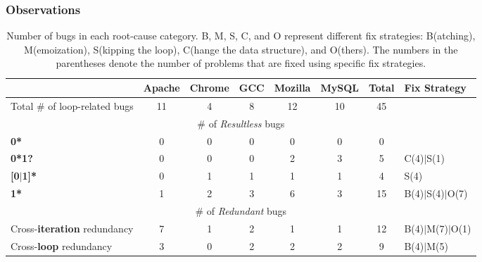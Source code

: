 \subsubsection{Observations}
\label{sec:study_ob}


\begin{table*}[tb!]
\small
\centering
{
\begin{tabular}{|lccccccl|}
\hline
&Apache&Chrome&GCC&Mozilla&MySQL&Total&Fix Strategy\\
\hline
Total \# of loop-related bugs & 11 & 4 & 8 & 12 & 10 & 45 &  \\
\hline
\multicolumn{8}{|c|}{\# of {\textit {Resultless}} bugs}\\
\multicolumn{1}{|l}{ {\bf 0*} }
&0&0&0&0&0&0&\\
\multicolumn{1}{|l}{ {\bf 0*1?} }
&0&0&0&2&3&5&C(4)$|$S(1)\\
\multicolumn{1}{|l}{{\bf [0$|$1]*}}
&0&1&1&1&1&4&S(4)\\
\multicolumn{1}{|l}{{\bf 1*}}
&1&2&3&6&3&15& B(4)$|$S(4)$|$O(7)\\
\hline
\multicolumn{8}{|c|}{ \# of {\textit {Redundant}} bugs}\\
\multicolumn{1}{|l}{Cross-{\bf iteration} redundancy}
&7&1&2&1&1&12&B(4)$|$M(7)$|$O(1)\\
\multicolumn{1}{|l}{ Cross-{\bf loop} redundancy}
&3&0&2&2&2&9&B(4)$|$M(5)\\
\hline
\end{tabular}
}
\caption{Number of bugs in each root-cause category. 
B, M, S, C, and O represent different fix strategies:
B(atching),  
M(emoization), 
S(kipping the loop),
C(hange the data structure), and O(thers). The numbers in the 
parentheses denote the number of problems that are fixed using specific
fix strategies.}
\label{tab:root}
\end{table*}






\def\cca#1{\cellcolor{black!#10}\ifnum #1>5\color{white}\fi{#1}}



